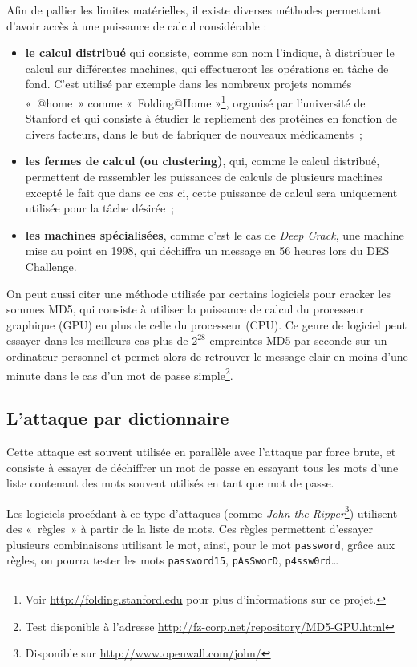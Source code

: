 Afin de pallier les limites matérielles, il existe diverses
méthodes permettant d'avoir accès à une puissance de
calcul considérable :
\begin{itemize}
  \item {\sffamily\textbf{le calcul distribué}} qui consiste, comme son nom
l'indique,
à distribuer le calcul sur différentes machines, qui effectueront
les opérations en tâche de fond. C'est utilisé par exemple dans
les nombreux projets nommés «~@home~» comme «~Folding@Home
»\footnote{Voir \url{http://folding.stanford.edu} pour plus
d'informations sur ce projet.},
organisé par l'université de Stanford et qui consiste à étudier
le repliement des protéines en fonction de divers facteurs, dans
le but de fabriquer de nouveaux médicaments~;
  \item {\sffamily\textbf{les fermes de calcul (ou clustering)}}, qui, comme le
calcul distribué, permettent de rassembler les puissances de
calculs de plusieurs machines excepté le fait que dans ce cas ci, cette
puissance de calcul sera uniquement utilisée pour la tâche
désirée~;
  \item {\sffamily\textbf{les machines spécialisées}}, comme c'est le cas de
\emph{Deep Crack}, une machine mise au point en 1998, qui déchiffra
un message en 56 heures lors du DES Challenge.\\
\end{itemize}

On peut aussi citer une méthode utilisée par certains logiciels pour
cracker les sommes MD5, qui consiste à utiliser la
puissance de calcul du processeur graphique (GPU) en plus de celle
du processeur (CPU). Ce genre de logiciel peut essayer dans les
meilleurs cas plus de
$2^{28}$ empreintes MD5 par seconde sur un ordinateur 
personnel et permet alors de retrouver le message clair en
moins d'une minute dans le cas d'un mot de passe simple\footnote{Test disponible à l'adresse
\url{http://fz-corp.net/repository/MD5-GPU.html}}.

\subsection{L'attaque par dictionnaire}
Cette attaque est souvent utilisée en parallèle avec l'attaque par
force brute, et consiste à essayer de déchiffrer un mot de passe
en essayant tous les mots d'une liste contenant des mots souvent
utilisés en tant que mot de passe.

Les logiciels procédant à ce type d'attaques (comme \emph{John the
Ripper}\footnote{Disponible sur
\url{http://www.openwall.com/john/}}) utilisent des «~règles~» à
partir de la liste de mots. Ces règles permettent d'essayer
plusieurs combinaisons utilisant le mot, ainsi, pour le mot
\texttt{password}, grâce aux règles, on pourra tester les mots
\texttt{password15}, \texttt{pAsSworD}, \texttt{p4ssw0rd}\dots

